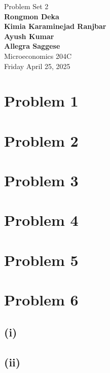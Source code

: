 \documentclass{article}
\begin{document}
\begin{titlepage}
    \centering
    \vspace*{1in} 
    {\Large Problem Set 2} \\[1.5cm] %

    {\large \textbf{Rongmon Deka \\
    Kimia Karaminejad Ranjbar \\
    Ayush Kumar \\
    Allegra Saggese}} \\[0.75cm] %
    {\Large Microeconomics 204C} \\[1.5cm]

    {\large Friday April 25, 2025} %
    \\[2cm] 
\end{titlepage}


\section*{Problem 1} %


\section*{Problem 2} %


\section*{Problem 3} %


\section*{Problem 4} %


\section*{Problem 5} %


\section*{Problem 6} %

\subsection*{(i)}

\subsection*{(ii)}
\end{document}
